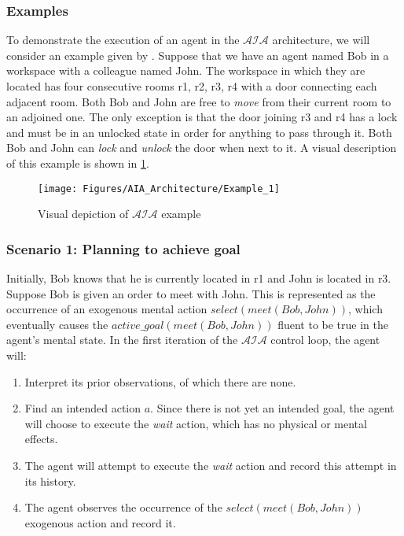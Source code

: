 \subsubsection{Examples}
\label{subsubsec:aia_examples}

To demonstrate the execution of an agent in the $\mathcal{AIA}$ architecture, we will consider an example given by \citet{blount_architecture_2013}.
Suppose that we have an agent named Bob in a workspace with a colleague named John.
The workspace in which they are located has four consecutive rooms r1, r2, r3, r4 with a door connecting each adjacent room.
Both Bob and John are free to \textit{move} from their current room to an adjoined one.
The only exception is that the door joining r3 and r4 has a lock and must be in an unlocked state in order for anything to pass through it.
Both Bob and John can \textit{lock} and \textit{unlock} the door when next to it.
A visual description of this example is shown in \cref{fig:aia_example}.

\begin{figure}[h]
    \centering
    \texttt{[image: Figures/AIA\_Architecture/Example\_1]}
    \caption{Visual depiction of $\mathcal{AIA}$ example}
    \label{fig:aia_example}
\end{figure}

\subsubsection{Scenario 1: Planning to achieve goal~\citep{blount_towards_2014}}
\label{subsubsec:aia_scenario_1}

Initially, Bob knows that he is currently located in r1 and John is located in r3.
Suppose Bob is given an order to meet with John.
This is represented as the occurrence of an exogenous mental action $select(meet(Bob, John))$, which eventually causes the $active\_goal(meet(Bob, John))$ fluent to be true in the agent's mental state.
In the first iteration of the $\mathcal{AIA}$ control loop, the agent will:

\begin{enumerate}
    \item Interpret its prior observations, of which there are none.
    \item Find an intended action $a$.
        Since there is not yet an intended goal, the agent will choose to execute the \textit{wait} action, which has no physical or mental effects.
    \item The agent will attempt to execute the \textit{wait} action and record this attempt in its history.
    \item The agent observes the occurrence of the $select(meet(Bob, John))$ exogenous action and record it.
\end{enumerate}

